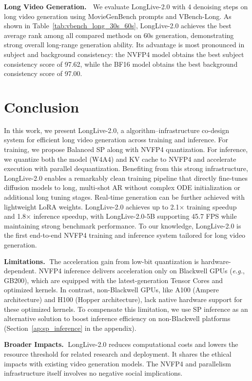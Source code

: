 \documentclass{llmxive}
\begin{document}
\textbf{Long Video Generation.} $\;$
We evaluate LongLive-2.0 with 4 denoising steps on long video generation using MovieGenBench prompts and VBench-Long. As shown in Table~\ref{tab:vbench_long_30s_60s}, LongLive-2.0 achieves the best average rank among all compared methods on 60s generation, demonstrating strong overall long-range generation ability. Its advantage is most pronounced in subject and background consistency: the NVFP4 model obtains the best subject consistency score of 97.62, while the BF16 model obtains the best background consistency score of 97.00.


\section{Conclusion}
In this work, we present LongLive-2.0, a algorithm–infrastructure co-design system for efficient long video generation across training and inference. For training, we propose Balanced SP along with NVFP4 quantization. For inference, we quantize both the model (W4A4) and KV cache to NVFP4 and accelerate execution with parallel dequantization.
Benefiting from this strong infrastructure, LongLive-2.0 enables a remarkably clean training pipeline that directly fine-tunes diffusion models to long, multi-shot AR without complex ODE initialization or additional long tuning stages. Real-time generation can be further achieved with lightweight LoRA weights. LongLive-2.0 achieves up to 2.1× training speedup and 1.8× inference speedup, with LongLive-2.0-5B supporting 45.7 FPS while maintaining strong benchmark performance. To our knowledge, LongLive-2.0 is the first end-to-end NVFP4 training and inference system tailored for long video generation.

\textbf{Limitations.}$\;$ The acceleration gain from low-bit quantization is hardware-dependent. NVFP4 inference delivers acceleration only on Blackwell GPUs (\textit{e.g.}, GB200), which are equipped with the latest-generation Tensor Cores and optimized kernels. In contrast, non-Blackwell GPUs, like A100 (Ampere architecture) and H100 (Hopper architecture), lack native hardware support for these optimized kernels. To compensate this limitation, we use SP inference as an alternative solution to boost inference efficiency on non-Blackwell platforms (Section~\ref{ap:sp_inference} in the appendix).

\textbf{Broader Impacts.}$\;$
LongLive-2.0 reduces computational costs and lowers the resource threshold for related research and deployment. It shares the ethical impacts with existing video generation models. The NVFP4 and parallelism infrastructure itself involves no negative social implications.
\end{document}
